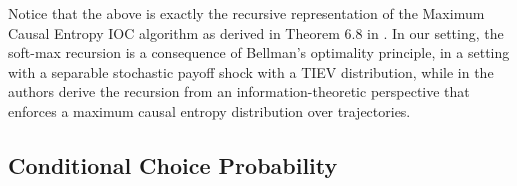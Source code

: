 \documentclass{article}
\begin{document}

Notice that the above is exactly the recursive representation of the Maximum Causal Entropy IOC algorithm as derived in Theorem 6.8 in \cite{ziebart_phd}. In our setting, the soft-max recursion is a consequence of Bellman's optimality principle, in a setting with a separable stochastic payoff shock with a TIEV distribution, while in \cite{ziebart_phd} the authors derive the recursion from an information-theoretic perspective that enforces a maximum causal entropy distribution over trajectories.

\subsection{Conditional Choice Probability}

\end{document}
